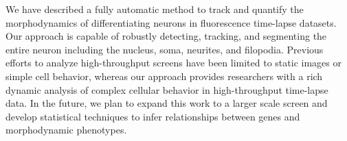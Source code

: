 We have described a  fully  automatic  method to  track  and  quantify  the
morphodynamics of  differentiating neurons in  fluorescence time-lapse
datasets.     Our  approach is capable of robustly detecting,
tracking, and segmenting the entire neuron including 
the nucleus, soma, neurites, and filopodia.  Previous efforts to analyze
high-throughput screens have been limited to static images or simple cell
behavior, whereas our approach provides researchers with a rich dynamic 
analysis of complex cellular behavior in high-throughput time-lapse data.
In the future, we plan to expand this
work to a larger scale screen and develop statistical techniques to 
infer relationships between genes and morphodynamic phenotypes.










